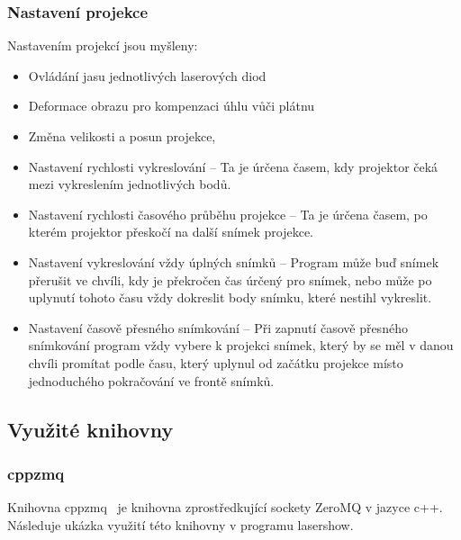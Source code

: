 \subsubsection{Nastavení projekce}
Nastavením projekcí jsou myšleny:
\begin{itemize}
\item Ovládání jasu jednotlivých laserových diod
\item Deformace obrazu pro kompenzaci úhlu vůči plátnu
\item Změna velikosti a posun projekce,
\item Nastavení rychlosti vykreslování -- Ta je úrčena časem, kdy projektor čeká mezi vykreslením jednotlivých bodů.
\item Nastavení rychlosti časového průběhu projekce -- Ta je úrčena časem, po kterém projektor přeskočí na další snímek projekce.
\item Nastavení vykreslování vždy úplných snímků -- Program může buď snímek přerušit ve chvíli, kdy je překročen čas úrčený pro snímek, nebo může po uplynutí tohoto času vždy dokreslit body snímku, které nestihl vykreslit.
\item Nastavení časově přesného snímkování -- Při zapnutí časově přesného snímkování program vždy vybere k projekci snímek, který by se měl v danou chvíli promítat podle času, který uplynul od začátku projekce místo jednoduchého pokračování ve frontě snímků.
\end{itemize}



\subsection{Využité knihovny}
\subsubsection{cppzmq}\label{sec:ls_cppzmq}
Knihovna cppzmq~\cite{cppzmq} je knihovna zprostředkující sockety ZeroMQ v jazyce c++. Následuje ukázka využití této knihovny v programu lasershow.
\inputminted[frame=lines,fontsize=\footnotesize{}, linenos, breaklines]{cpp}{code_examples/zmq_server.cpp}

